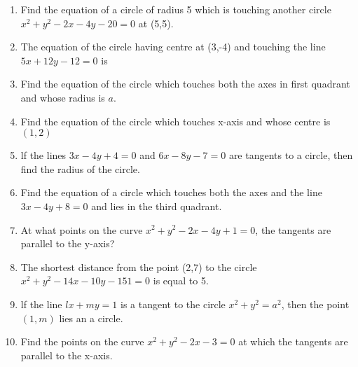 \begin{enumerate}[label=\thesection.\arabic*,ref=\thesection.\theenumi]

\item Find the equation of a circle of radius 5 which is touching another circle $x^2+y^2-2x-4y-20=0$ at (5,5).
\item The equation of the circle having centre at (3,-4) and touching the line $5x+12y-12=0$ is \makebox[1cm]{\hrulefill}                     
 \item Find the equation of the circle which touches both the axes in first quadrant and whose radius is $a$.
 \item Find the equation of the circle which touches x-axis and whose centre is $(1,2)$
 \item lf the lines $3x-4y+4=0$ and $6x-8y-7=0$ are tangents to a circle, then find the radius of the circle.
 \item Find the equation of a circle which touches  both the axes and the line $3x-4y+8=0$ and lies in the third quadrant.
\item At what points on the curve $x^2+y^2-2x-4y+1=0$, the tangents are parallel to the y-axis?
\item The shortest distance from the point (2,7) to the circle $x^2+y^2- 14x-10y-151=0$ is equal to 5.
\item lf the line $lx+my=1$ is a tangent to the circle $x^2+y^2=a^2$, then the point $(1,m)$ lies an a circle.
\item Find the points on the curve $x^2+y^2-2x-3=0$ at which the tangents are parallel to the x-axis.
\label{chapters/12/6/3/19}
\\
\solution


\end{enumerate}
